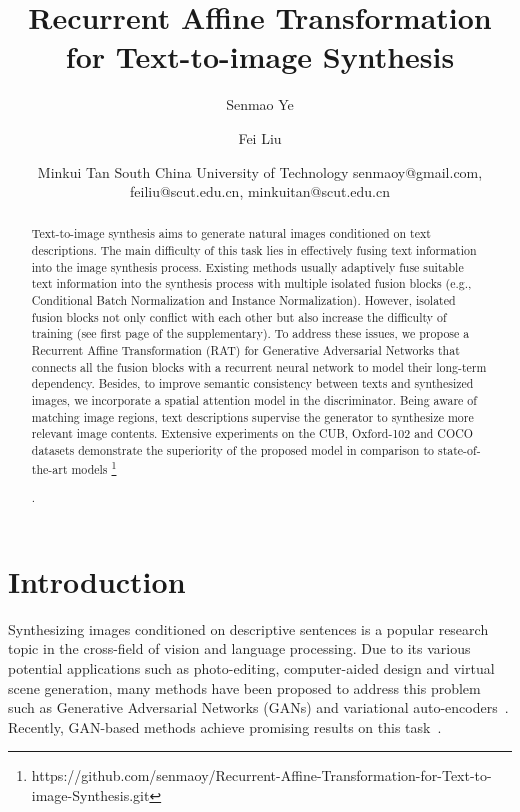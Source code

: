 \documentclass{article}
\title{ Recurrent Affine Transformation for Text-to-image Synthesis}
\author{
Senmao Ye
\and
Fei Liu\and
Minkui Tan
\affiliations
South China University of Technology
\emails
senmaoy@gmail.com,
feiliu@scut.edu.cn,
minkuitan@scut.edu.cn
}
\begin{document}
	
	\maketitle
	
	\begin{abstract}
			Text-to-image synthesis aims to generate natural images conditioned on text descriptions. The main difficulty of this task lies in effectively fusing text information into the image synthesis process. Existing methods usually adaptively fuse suitable text information into the synthesis process with multiple isolated fusion blocks (e.g., Conditional 
			Batch Normalization and Instance Normalization). However, isolated fusion blocks not only conflict with each other but also increase the difficulty of training (see first page of the supplementary). To address these issues, we propose a Recurrent Affine Transformation (RAT) for Generative Adversarial Networks that connects all the fusion blocks with a recurrent neural network to model their long-term dependency. Besides, to improve semantic consistency between texts and synthesized images, we incorporate a spatial attention model in the discriminator. Being aware of matching image regions, text descriptions supervise the generator to synthesize more relevant image contents. Extensive experiments on the CUB, Oxford-102 and COCO datasets demonstrate the superiority of the proposed model in comparison to state-of-the-art models \footnote{https://github.com/senmaoy/Recurrent-Affine-Transformation-for-Text-to-image-Synthesis.git}
		
			. 
	\end{abstract}
	
	\section{Introduction}
	Synthesizing images conditioned on descriptive sentences is a popular research topic in the cross-field of vision and language processing. Due to its various potential applications such as photo-editing, computer-aided design and virtual scene generation, many methods have been proposed to address this problem such as Generative Adversarial Networks (GANs) \cite{DBLP:conf/icml/ReedAYLSL16,DBLP:journals/pami/ZhangXLZWHM19,DBLP:conf/ijcai/FangXCTZ19} and variational auto-encoders~\cite{DBLP:conf/icml/GregorDGRW15,mansimov2015generating}. Recently, GAN-based methods achieve promising results on this task~\cite{DBLP:conf/cvpr/QiaoZXT19,DBLP:journals/corr/abs-2008-05865,DBLP:journals/corr/abs-2104-00567,DBLP:conf/cvpr/ZhuP0019,DBLP:journals/corr/abs-2108-12141}.
	
\end{document}

